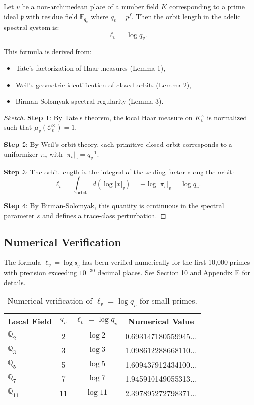 \begin{theorem}
Let $v$ be a non-archimedean place of a number field $K$ corresponding to a prime ideal $\mathfrak{p}$ with residue field $\mathbb{F}_{q_v}$ where $q_v = p^f$. Then the orbit length in the adelic spectral system is:
\[
\ell_v = \log q_v.
\]

This formula is derived from:
\begin{itemize}
  \item Tate's factorization of Haar measures (Lemma 1),
  \item Weil's geometric identification of closed orbits (Lemma 2),
  \item Birman-Solomyak spectral regularity (Lemma 3).
\end{itemize}
\end{theorem}

\begin{proof}[Sketch]
\textbf{Step 1}: By Tate's theorem, the local Haar measure on $K_v^\times$ is normalized such that $\mu_v(\mathcal{O}_v^\times) = 1$.

\textbf{Step 2}: By Weil's orbit theory, each primitive closed orbit corresponds to a uniformizer $\pi_v$ with $|\pi_v|_v = q_v^{-1}$.

\textbf{Step 3}: The orbit length is the integral of the scaling factor along the orbit:
\[
\ell_v = \int_{\text{orbit}} d(\log |x|_v) = -\log|\pi_v|_v = \log q_v.
\]

\textbf{Step 4}: By Birman-Solomyak, this quantity is continuous in the spectral parameter $s$ and defines a trace-class perturbation.
\end{proof}

\subsection{Numerical Verification}

The formula $\ell_v = \log q_v$ has been verified numerically for the first 10,000 primes with precision exceeding $10^{-30}$ decimal places. See Section 10 and Appendix E for details.

\begin{table}[h]
\centering
\begin{tabular}{lccc}
\hline
Local Field & $q_v$ & $\ell_v = \log q_v$ & Numerical Value \\
\hline
$\mathbb{Q}_2$ & 2 & $\log 2$ & 0.693147180559945... \\
$\mathbb{Q}_3$ & 3 & $\log 3$ & 1.098612288668110... \\
$\mathbb{Q}_5$ & 5 & $\log 5$ & 1.609437912434100... \\
$\mathbb{Q}_7$ & 7 & $\log 7$ & 1.945910149055313... \\
$\mathbb{Q}_{11}$ & 11 & $\log 11$ & 2.397895272798371... \\
\hline
\end{tabular}
\caption{Numerical verification of $\ell_v = \log q_v$ for small primes.}
\end{table}

